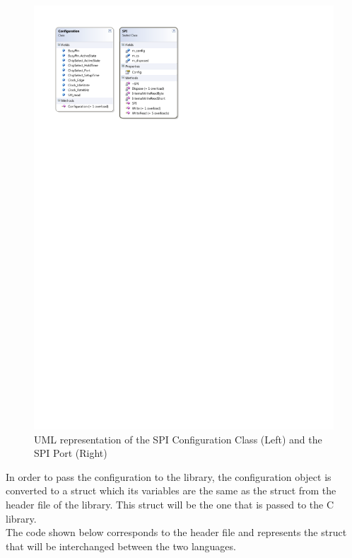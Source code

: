 \begin{figure}[H]\begin{center}
 \centering
  \captionsetup{justification=centering}
  \includegraphics[scale=1]{pictures/iosharp/spi-uml}
  \caption{UML representation of the SPI Configuration Class (Left) and the SPI Port (Right) \label{fig:spi-uml}}
\end{center}\end{figure}

In order to pass the configuration to the library, the configuration object is converted to a struct which its variables are the same as the struct from the header file of the library. This struct will be the one that is passed to the C library.
\\
The code shown below corresponds to the header file and represents the struct that will be interchanged between the two languages.

